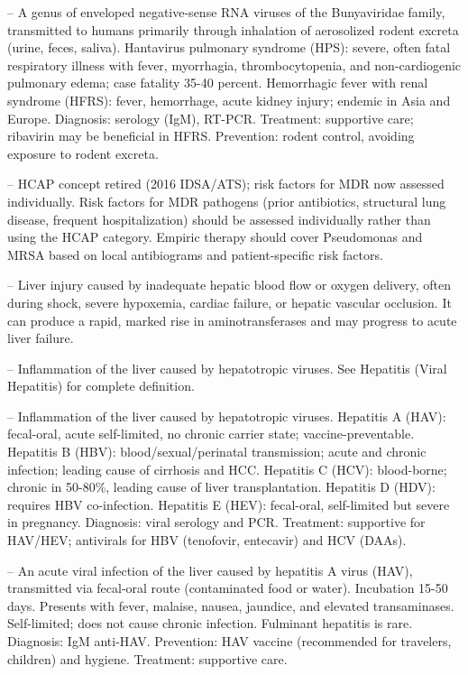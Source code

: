 -- A genus of enveloped negative-sense RNA viruses of the Bunyaviridae family, transmitted to humans primarily through inhalation of aerosolized rodent excreta (urine, feces, saliva). Hantavirus pulmonary syndrome (HPS): severe, often fatal respiratory illness with fever, myorrhagia, thrombocytopenia, and non-cardiogenic pulmonary edema; case fatality 35-40 percent. Hemorrhagic fever with renal syndrome (HFRS): fever, hemorrhage, acute kidney injury; endemic in Asia and Europe. Diagnosis: serology (IgM), RT-PCR. Treatment: supportive care; ribavirin may be beneficial in HFRS. Prevention: rodent control, avoiding exposure to rodent excreta.

-- HCAP concept retired (2016 IDSA/ATS); risk factors for MDR now assessed individually. Risk factors for MDR pathogens (prior antibiotics, structural lung disease, frequent hospitalization) should be assessed individually rather than using the HCAP category. Empiric therapy should cover Pseudomonas and MRSA based on local antibiograms and patient-specific risk factors.

-- Liver injury caused by inadequate hepatic blood flow or oxygen delivery, often during shock, severe hypoxemia, cardiac failure, or hepatic vascular occlusion. It can produce a rapid, marked rise in aminotransferases and may progress to acute liver failure.

-- Inflammation of the liver caused by hepatotropic viruses. See Hepatitis (Viral Hepatitis) for complete definition.

-- Inflammation of the liver caused by hepatotropic viruses. Hepatitis A (HAV): fecal-oral, acute self-limited, no chronic carrier state; vaccine-preventable. Hepatitis B (HBV): blood/sexual/perinatal transmission; acute and chronic infection; leading cause of cirrhosis and HCC. Hepatitis C (HCV): blood-borne; chronic in 50-80\%, leading cause of liver transplantation. Hepatitis D (HDV): requires HBV co-infection. Hepatitis E (HEV): fecal-oral, self-limited but severe in pregnancy. Diagnosis: viral serology and PCR. Treatment: supportive for HAV/HEV; antivirals for HBV (tenofovir, entecavir) and HCV (DAAs).

-- An acute viral infection of the liver caused by hepatitis A virus (HAV), transmitted via fecal-oral route (contaminated food or water). Incubation 15-50 days. Presents with fever, malaise, nausea, jaundice, and elevated transaminases. Self-limited; does not cause chronic infection. Fulminant hepatitis is rare. Diagnosis: IgM anti-HAV. Prevention: HAV vaccine (recommended for travelers, children) and hygiene. Treatment: supportive care.


